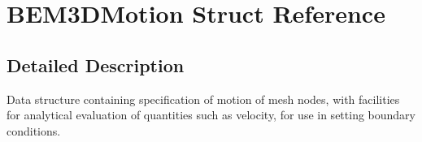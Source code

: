 \section{B\+E\+M3\+D\+Motion Struct Reference}
\label{structBEM3DMotion}


\subsection{Detailed Description}
Data structure containing specification of motion of mesh nodes, with facilities for analytical evaluation of quantities such as velocity, for use in setting boundary conditions. 